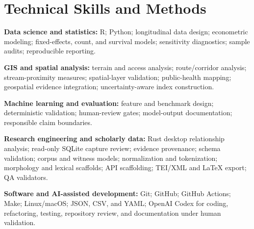 \documentclass[10.5pt,letterpaper]{article}
\begin{document}
\section*{Technical Skills and Methods}
\begin{cvbullets}
    \item \textbf{Data science and statistics:} R; Python; longitudinal data design; econometric modeling; fixed-effects, count, and survival models; sensitivity diagnostics; sample audits; reproducible reporting.
    \item \textbf{GIS and spatial analysis:} terrain and access analysis; route/corridor analysis; stream-proximity measures; spatial-layer validation; public-health mapping; geospatial evidence integration; uncertainty-aware index construction.
    \item \textbf{Machine learning and evaluation:} feature and benchmark design; deterministic validation; human-review gates; model-output documentation; responsible claim boundaries.
    \item \textbf{Research engineering and scholarly data:} Rust desktop relationship analysis; read-only SQLite capture review; evidence provenance; schema validation; corpus and witness models; normalization and tokenization; morphology and lexical scaffolds; API scaffolding; TEI/XML and LaTeX export; QA validators.
    \item \textbf{Software and AI-assisted development:} Git; GitHub; GitHub Actions; Make; Linux/macOS; JSON, CSV, and YAML; OpenAI Codex for coding, refactoring, testing, repository review, and documentation under human validation.
\end{cvbullets}
\end{document}
